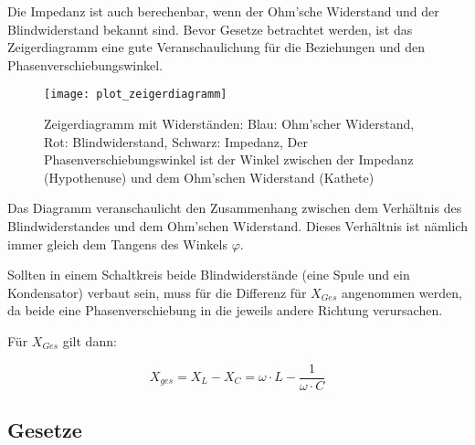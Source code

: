 Die Impedanz ist auch berechenbar, wenn der Ohm'sche Widerstand und der Blindwiderstand bekannt sind. Bevor Gesetze betrachtet werden, ist das Zeigerdiagramm eine gute Veranschaulichung für die Beziehungen und den Phasenverschiebungswinkel.

\begin{figure}[h!]
	\centering
	\texttt{[image: plot\_zeigerdiagramm]}
	\begin{comment} Gnuplot:
set ylabel "X_L - X_C"
set label "R" at 2.5,-0.2
set label "Z" at 2.7,0.6
set arrow from graph 0,0.5 to graph 0,0.9 size screen 0.01,22,60 filled ls 1 front
set arrow from graph 0,0.5 to graph 0.85,0.5 size screen 0.01,22,60 filled ls 3 front
set arrow from graph 0,0.5 to graph 0.85,0.9 size screen 0.01,22,60 filled ls 2 front
set arrow from graph 0.85,0.5 to graph 0.85,0.9 size screen 0.01,22,60 filled ls 1 front
unset key
set output "plot_zeigerdiagramm.png"
plot 100
	\end{comment}
	\caption{Zeigerdiagramm mit Widerständen: Blau: Ohm'scher Widerstand, Rot: Blindwiderstand, Schwarz: Impedanz, Der Phasenverschiebungswinkel ist der Winkel zwischen der Impedanz (Hypothenuse) und dem Ohm'schen Widerstand (Kathete)}
\end{figure}


Das Diagramm veranschaulicht den Zusammenhang zwischen dem Verhältnis des Blindwiderstandes und dem Ohm'schen Widerstand. Dieses Verhältnis ist nämlich immer gleich dem Tangens des Winkels $\varphi$.

\begin{Anmerkung}
Sollten in einem Schaltkreis beide Blindwiderstände (eine Spule und ein Kondensator) verbaut sein, muss für die Differenz für $X_{Ges}$ angenommen werden, da beide eine Phasenverschiebung in die jeweils andere Richtung verursachen.
\end{Anmerkung}

\noindent Für $X_{Ges}$ gilt dann:

\begin{equation}	\label{eq:BlindwiderstandSumme}
	X_{ges} = X_L - X_C = \omega \cdot L - \frac{1}{\omega \cdot C}
\end{equation}



\subsection{Gesetze}	\label{subsec:WiderstaendeGesetzte}


